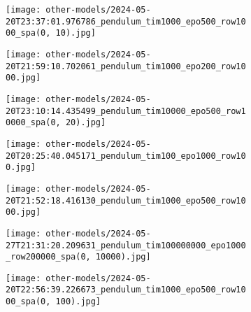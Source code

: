 \begin{figure}[H]
    \centering
    \begin{subfigure}{.47\linewidth}
        \centering
        \texttt{[image: other-models/2024-05-20T23:37:01.976786\_pendulum\_tim1000\_epo500\_row1000\_spa(0, 10).jpg]}
    \end{subfigure}
    \begin{subfigure}{.47\linewidth}
        \centering
        \texttt{[image: other-models/2024-05-20T21:59:10.702061\_pendulum\_tim1000\_epo200\_row1000.jpg]}
    \end{subfigure}
    \begin{subfigure}{.47\linewidth}
        \centering
        \texttt{[image: other-models/2024-05-20T23:10:14.435499\_pendulum\_tim10000\_epo500\_row10000\_spa(0, 20).jpg]}
    \end{subfigure}
    \begin{subfigure}{.47\linewidth}
        \centering
        \texttt{[image: other-models/2024-05-20T20:25:40.045171\_pendulum\_tim100\_epo1000\_row100.jpg]}
    \end{subfigure}
\end{figure}
\begin{figure}[H]
    \centering
    \begin{subfigure}{.47\linewidth}
        \centering
        \texttt{[image: other-models/2024-05-20T21:52:18.416130\_pendulum\_tim1000\_epo500\_row1000.jpg]}
    \end{subfigure}
    \begin{subfigure}{.47\linewidth}
        \centering
        \texttt{[image: other-models/2024-05-27T21:31:20.209631\_pendulum\_tim100000000\_epo1000\_row200000\_spa(0, 10000).jpg]}
    \end{subfigure}
    \begin{subfigure}{.47\linewidth}
        \centering
        \texttt{[image: other-models/2024-05-20T22:56:39.226673\_pendulum\_tim1000\_epo500\_row1000\_spa(0, 100).jpg]}
    \end{subfigure}
\end{figure}
